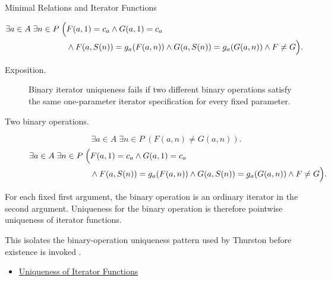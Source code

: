 \begin{topicbox}{Minimal Relations and Iterator Functions}
\begin{remark*}
\[
\begin{aligned}
\exists a\in A\;\exists n\in P\;\Bigl(&
F(a,1)=c_a\land G(a,1)=c_a\\
&\land F(a,S(n))=g_a(F(a,n))
\land G(a,S(n))=g_a(G(a,n))
\land F\neq G\Bigr).
\end{aligned}
\]
\end{remark*}

\begin{remark*}
\begin{description}
  \item[Exposition.]
  Binary iterator uniqueness fails if two different binary operations satisfy
  the same one-parameter iterator specification for every fixed parameter.
  \item[Two binary operations.]
  \[
  \exists a\in A\;\exists n\in P\;(F(a,n)\neq G(a,n)).
  \]
  \[
  \begin{aligned}
  \exists a\in A\;\exists n\in P\;\Bigl(&
  F(a,1)=c_a\land G(a,1)=c_a\\
  &\land F(a,S(n))=g_a(F(a,n))
  \land G(a,S(n))=g_a(G(a,n))
  \land F\neq G\Bigr).
  \end{aligned}
  \]
\end{description}
\end{remark*}

\begin{remark*}[Interpretation]
For each fixed first argument, the binary operation is an ordinary iterator in
the second argument. Uniqueness for the binary operation is therefore
pointwise uniqueness of iterator functions.
\end{remark*}

\begin{remark*}
This isolates the binary-operation uniqueness pattern used by Thurston before
existence is invoked \citep{thurston1956numbersystem}.
\end{remark*}

\begin{dependencies}
\begin{itemize}
  \item \hyperref[lem:uniqueness-of-iterator-functions]{Uniqueness of Iterator Functions}
\end{itemize}
\end{dependencies}
\end{topicbox}

